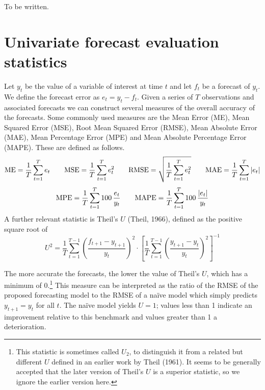 To be written.

\section{Univariate forecast evaluation statistics}
\label{sec:fcast-stats}

Let $y_t$ be the value of a variable of interest at time $t$ and let
$f_t$ be a forecast of $y_t$.  We define the forecast error as $e_t =
y_t - f_t$.  Given a series of $T$ observations and associated
forecasts we can construct several measures of the overall accuracy of
the forecasts.  Some commonly used measures are the Mean Error (ME),
Mean Squared Error (MSE), Root Mean Squared Error (RMSE), Mean
Absolute Error (MAE), Mean Percentage Error (MPE) and Mean Absolute
Percentage Error (MAPE).  These are defined as follows.
%
\[ {\rm ME} = \frac{1}{T} \sum_{t=1}^T e_t \qquad 
   {\rm MSE} = \frac{1}{T} \sum_{t=1}^T e_t^2 \qquad 
   {\rm RMSE} = \sqrt{\frac{1}{T} \sum_{t=1}^T e_t^2} \qquad 
   {\rm MAE} = \frac{1}{T} \sum_{t=1}^T |e_t|
\] 
%
\[ {\rm MPE} = \frac{1}{T} \sum_{t=1}^T 100\, \frac{e_t}{y_t} \qquad
   {\rm MAPE} = \frac{1}{T} \sum_{t=1}^T 100\, \frac{|e_t|}{y_t} 
\]
%
A further relevant statistic is Theil's $U$ (Theil, 1966), defined as
the positive square root of
%
\[ 
U^2 = \frac{1}{T}
     \sum_{t=1}^{T-1} \left(\frac{f_{t+1} - y_{t+1}}{y_t}\right)^2
     \cdot \left[
     \frac{1}{T} \sum_{t=1}^{T-1} 
        \left(\frac{y_{t+1} - y_t}{y_t}\right)^2 \right]^{-1}
\]

The more accurate the forecasts, the lower the value of Theil's $U$,
which has a minimum of 0.\footnote{This statistic is sometimes called
  $U_2$, to distinguish it from a related but different $U$ defined in
  an earlier work by Theil (1961).  It seems to be generally accepted
  that the later version of Theil's $U$ is a superior statistic, so we
  ignore the earlier version here.} This measure can be interpreted as
the ratio of the RMSE of the proposed forecasting model to the RMSE of
a na\"ive model which simply predicts $y_{t+1} = y_t$ for all $t$.
The na\"ive model yields $U = 1$; values less than 1 indicate an
improvement relative to this benchmark and values greater than 1 a
deterioration.

